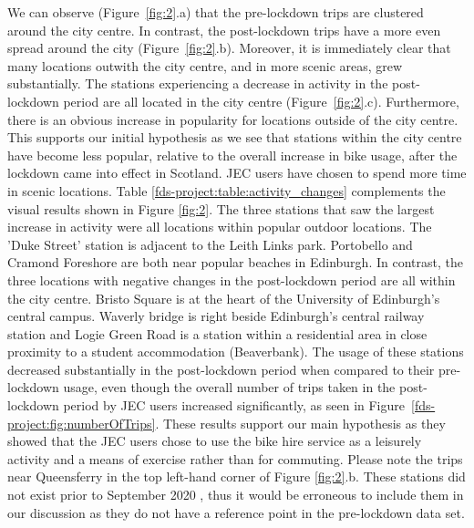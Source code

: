 \documentclass[11pt,a4paper]{article}
\begin{document}
We can observe (Figure~\ref{fig:2}.a) that the pre-lockdown trips are clustered around the city centre. In contrast, the post-lockdown trips have a more even spread around the city (Figure~\ref{fig:2}.b). Moreover, it is immediately clear that many locations outwith the city centre, and in more scenic areas, grew substantially. The stations experiencing a decrease in activity in the post-lockdown period are all located in the city centre (Figure~\ref{fig:2}.c). Furthermore, there is an obvious increase in popularity for locations outside of the city centre. This supports our initial hypothesis as we see that stations within the city centre have become less popular, relative to the overall increase in bike usage, after the lockdown came into effect in Scotland. JEC users have chosen to spend more time in scenic locations. Table \ref{fds-project:table:activity_changes} complements the visual results shown in Figure \ref{fig:2}. The three stations that saw the largest increase in activity were all locations within popular outdoor locations. The 'Duke Street' station is adjacent to the Leith Links park. Portobello and Cramond Foreshore are both near popular beaches in Edinburgh. In contrast, the three locations with negative changes in the post-lockdown period are all within the city centre. Bristo Square is at the heart of the University of Edinburgh's central campus. Waverly bridge is right beside Edinburgh's central railway station and Logie Green Road is a station within a residential area in close proximity to a student accommodation (Beaverbank). The usage of these stations decreased substantially in the post-lockdown period when compared to their pre-lockdown usage, even though the overall number of trips taken in the post-lockdown period by JEC users increased significantly, as seen in Figure~\ref{fds-project:fig:numberOfTrips}. These results support our main hypothesis as they showed that the JEC users chose to use the bike hire service as a leisurely activity and a means of exercise rather than for commuting. Please note the trips near Queensferry in the top left-hand corner of Figure \ref{fig:2}.b. These stations did not exist prior to September 2020 \cite{Dalton1}, thus it would be erroneous to include them in our discussion as they do not have a reference point in the pre-lockdown data set. 
\end{document}
